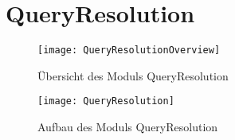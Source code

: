 
\section{QueryResolution}

\begin{figure}[htb]
    	\centering
  	\texttt{[image: QueryResolutionOverview]}
  	\caption{Übersicht des Moduls QueryResolution}
\end{figure}

\begin{figure}[htb]
    	\centering
  	\texttt{[image: QueryResolution]}
  	\caption{Aufbau des Moduls QueryResolution}
\end{figure}

%


\pagebreak
\clearpage
